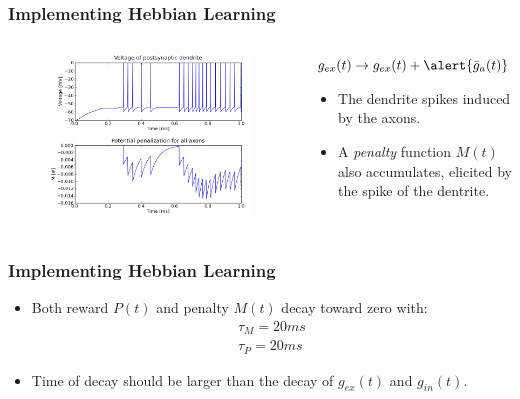 \documentclass{beamer}
\begin{document}
	\begin{frame} 
		\frametitle{Implementing Hebbian Learning}
		\begin{columns} 
				\begin{figure} 
					\centering
					\includegraphics[width=\textwidth]{graphics/demo/fig02} 
				\end{figure} 
				\begin{block}{$g_{ex}(t) \rightarrow g_{ex}(t) + \alert{\bar{g}_a(t)}$}
					\hspace{5 mm}
					\begin{itemize} 
						\item The dendrite spikes induced by the axons. \\
						\hspace{5 mm}
						\item A \alert{\emph{penalty} function $M(t)$} also accumulates, elicited by the spike of the dentrite. 
					\end{itemize}
				\end{block}
		\end{columns}
	\end{frame}
	
	\begin{frame} 
		\frametitle{Implementing Hebbian Learning}
		\begin{itemize} 
			\item Both reward $P(t)$ and penalty $M(t)$ decay toward zero with: 
				\begin{eqnarray} 
					\tau_M = 20 ms \nonumber \\
					\tau_P = 20 ms \nonumber
				\end{eqnarray}
			\item Time of decay should be larger than the decay of $g_{ex}(t)$ and $g_{in}(t)$. 
		\end{itemize}
	\end{frame}
	
\end{document}
